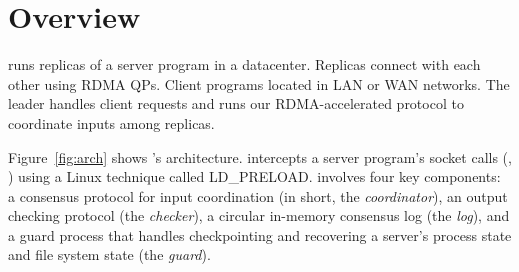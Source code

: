 

\section{\xxx Overview}\label{sec:overview}

 





\xxx runs replicas of a server program in a datacenter. Replicas connect with 
each other using RDMA QPs. Client programs located in LAN or WAN networks. The 
leader handles client requests and runs our RDMA-accelerated \paxos protocol to 
coordinate inputs among replicas.

Figure~\ref{fig:arch} shows \xxx's architecture. \xxx intercepts a server 
program's socket calls (\eg, \recv) using a Linux technique called LD\_PRELOAD. 
\xxx involves four key components: a \paxos consensus protocol for input 
coordination (in short, the \emph{coordinator}), an output checking protocol 
(the \emph{checker}), a circular in-memory consensus log (the 
\emph{log}), and a guard process that handles checkpointing and recovering a 
server's process state and file system state (the \emph{guard}).

